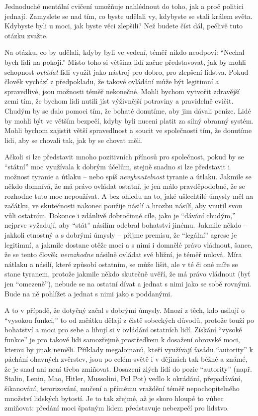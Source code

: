 \documentclass{book}
\begin{document}
Jednoduché mentální cvičení umožňuje nahlédnout do toho, jak a proč politici jednají. Zamyslete se nad tím, co byste udělali vy, kdybyste se stali králem světa. Kdybyste byli u moci, jak byste věci zlepšili? Než budete číst dál, pečlivě tuto otázku zvažte.

Na otázku, co by udělali, kdyby byli ve vedení, téměř nikdo neodpoví: \enquote{Nechal bych lidi na pokoji.} Místo toho si většina lidí začne představovat, jak by mohli schopnost \emph{ovládat} lidi využít jako nástroj pro dobro, pro zlepšení lidstva. Pokud člověk vychází z předpokladu, že takové ovládání může být legitimní a spravedlivé, jsou možnosti téměř nekonečné. Mohli bychom vytvořit zdravější zemi tím, že bychom lidi nutili jíst výživnější potraviny a pravidelně cvičit. Chudým by se dalo pomoci tím, že bohaté donutíme, aby jim dávali peníze. Lidé by mohli být ve větším bezpečí, kdyby byli nuceni platit za silný obranný systém. Mohli bychom zajistit větší spravedlnost a soucit ve společnosti tím, že donutíme lidi, aby se chovali tak, jak by se chovat měli.

Ačkoli si lze představit mnoho pozitivních přínosů pro společnost, pokud by se \enquote{státní} moc využívala k dobrým účelům, stejně snadno si lze představit i možnost tyranie a útlaku -- nebo spíš \emph{nevyhnutelnost} tyranie a útlaku. Jakmile se někdo domnívá, že má právo ovládat ostatní, je jen málo pravděpodobné, že se rozhodne tuto moc nepoužívat. A bez ohledu na to, jaké ušlechtilé úmysly měl na začátku, ve skutečnosti nakonec použije násilí a hrozbu násilí, aby vnutil svou vůli ostatním. Dokonce i zdánlivě dobročinné cíle, jako je \enquote{dávání chudým,} nejprve vyžadují, aby \enquote{stát} násilím odebral bohatství jinému. Jakmile někdo -- jakkoli ctnostný a s dobrými úmysly -- přijme premisu, že \enquote{legální} agrese je legitimní, a jakmile dostane otěže moci a s nimi i domnělé právo vládnout, šance, že se tento člověk \emph{nerozhodne} násilně ovládat své bližní, je téměř nulová. Míra nátlaku a násilí, které způsobí ostatním, se může lišit, ale v té či oné míře se stane tyranem, protože jakmile někdo skutečně uvěří, že má právo vládnout (byť jen \enquote{omezeně}), nebude se na ostatní dívat a jednat s nimi jako se sobě rovnými. Bude na ně pohlížet a jednat s nimi jako s poddanými.

A to v případě, že dotyčný začal s dobrými úmysly. Mnozí z těch, kdo usilují o \enquote{vysokou funkci,} to od začátku dělají z čistě sobeckých důvodů, protože touží po bohatství a moci pro sebe a libují si v ovládání ostatních lidí. Získání \enquote{vysoké funkce} je pro takové lidi samozřejmě prostředkem k dosažení obrovské moci, kterou by jinak neměli. Příklady megalomanů, kteří využívají fasádu \enquote{autority} k páchání ohavných zvěrstev, jsou po celém světě i v dějinách tak běžné a známé, že je snad ani není třeba zmiňovat. Dosazení zlých lidí do pozic \enquote{autority} (např. Stalin, Lenin, Mao, Hitler, Mussolini, Pol Pot) vedlo k okrádání, přepadávání, šikanování, terorizování, mučení a přímému vraždění téměř nepochopitelného množství lidských bytostí. Je to tak zřejmé, až je skoro hloupé to vůbec zmiňovat: předání moci špatným lidem představuje nebezpečí pro lidstvo.
\end{document}
